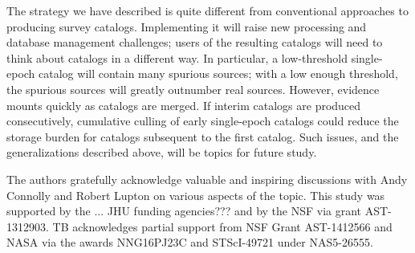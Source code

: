 \documentclass[twocolumn]{emulateapj}
\begin{document}
The strategy we have described is quite different from conventional approaches to producing survey catalogs.
Implementing it will raise new processing and database management challenges; users of the resulting catalogs will need to think about catalogs in a different way.
In particular, a low-threshold single-epoch catalog will contain many spurious sources; with a low enough threshold, the spurious sources will greatly outnumber real sources.
However, evidence mounts quickly as catalogs are merged.
If interim catalogs are produced consecutively, cumulative culling of early single-epoch catalogs could reduce the storage burden for catalogs subsequent to the first catalog.
Such issues, and the generalizations described above, will be topics for future study.





\acknowledgements{}
The authors gratefully acknowledge valuable and inspiring discussions with Andy Connolly and Robert Lupton on various aspects of the topic.
This study was supported by the ... {\color{red}JHU funding agencies???} and by the NSF via grant AST-1312903.
%
{\color{blue}
TB acknowledges partial support from NSF Grant AST-1412566 and NASA via the awards NNG16PJ23C and STScI-49721 under NAS5-26555.}
\end{document}
